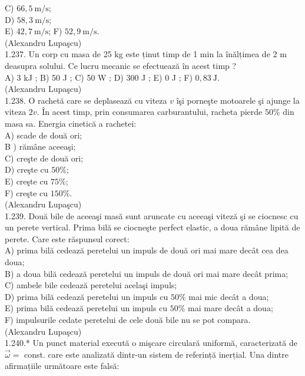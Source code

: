 {\begin{itemize}
{C) $66,5 \mathrm{~m} / \mathrm{s}$;\\
D) $58,3 \mathrm{~m} / \mathrm{s}$;\\
E) $42,7 \mathrm{~m} / \mathrm{s}$; F) $52,9 \mathrm{~m} / \mathrm{s}$.\\
(Alexandru Lupaşcu)\\
1.237. Un corp cu masa de 25 kg este ținut timp de 1 min la înălțimea de 2 m deasupra solului. Ce lucru mecanic se efectuează în acest timp ?\\
A) 3 kJ ; B) 50 J ; C) 50 W ; D) 300 J ; E) 0 J ; F) $0,83 \mathrm{~J}$.\\
(Alexandru Lupaşcu)\\
1.238. O rachetă care se deplasează cu viteza $v$ îşi porneşte motoarele şi ajunge la viteza $2 v$. În acest timp, prin consumarea carburantului, racheta pierde $50 \%$ din masa sa. Energia cinetică a rachetei:\\
A) scade de două ori;\\
B ) rămâne aceeaşi;\\
C) creşte de două ori;\\
D) creşte cu $50 \%$;\\
E) creşte cu $75 \%$;\\
F) creşte cu $150 \%$.\\
(Alexandru Lupaşcu)\\
1.239.} Două bile de aceeaşi masă sunt aruncate cu aceeaşi viteză şi se ciocnesc cu un perete vertical. Prima bilă se ciocneşte perfect elastic, a doua rămâne lipită de perete. Care este răspunsul corect:\\
A) prima bilă cedează peretelui un impuls de două ori mai mare decât cea dea doua;\\
B) a doua bilă cedează peretelui un impuls de două ori mai mare decât prima;\\
C) ambele bile cedează peretelui acelaşi impuls;\\
D) prima bilă cedează peretelui un impuls cu $50 \%$ mai mic decât a doua;\\
E) prima bilă cedează peretelui un impuls cu $50 \%$ mai mare decât a doua;\\
F) impulsurile cedate peretelui de cele două bile nu se pot compara.\\
(Alexandru Lupaşcu)\\
1.240.* Un punct material execută o mişcare circulară uniformă, caracterizată de $\vec{\omega}=$ const. care este analizată dintr-un sistem de referință inerțial. Una dintre afirmațiile următoare este falsă:\\

\end{itemize}}
